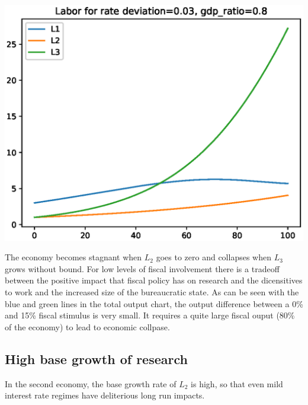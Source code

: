 \documentclass[12pt]{article}
\theoremstyle{definition}
\begin{document}
\begin{minipage}{\linewidth}
\begin{framed}
\begin{minipage}[t]{.48\textwidth}
\includegraphics[width=1\textwidth]{images/econ_0_run_4_labor}
\end{minipage}\hfill
\end{framed}
\end{minipage}

The economy becomes stagnant when \(L_2\) goes to zero and collapses when \(L_3\) grows without bound.  For low levels of fiscal involvement there is a tradeoff between the positive impact that fiscal policy has on research and the dicensitives to work and the increased size of the bureaucratic state.  As can be seen with the blue and green lines in the total output chart, the output difference between a 0\% and 15\% fiscal stimulus is very small.  It requires a quite large fiscal ouput (80\% of the economy) to lead to economic collpase.



\subsection{High base growth of research}

In the second economy, the base growth rate of \(L_2\) is high, so that even mild interest rate regimes have deliterious long run impacts.
\end{document}
